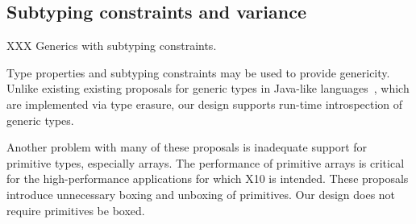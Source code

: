 \documentclass[preprint,nocopyrightspace,9pt]{sigplanconf}
\begin{document}
\subsection{Subtyping constraints and variance}
\label{sec:variance}

XXX Generics with subtyping constraints.

Type properties and subtyping constraints may be used to 
provide genericity.  Unlike existing 
existing proposals for generic types in
Java-like
languages~\cite{Java3,adding-wildcards,GJ,Pizza,polyj,thorup97,allen03,allen04,csharp,emir06,scala},
which 
are implemented via type erasure,
our design supports run-time introspection of generic types.

Another problem with many of these proposals is inadequate support
for primitive types, especially arrays. The performance of primitive arrays is
critical for the high-performance applications for which
X10 is intended. These proposals introduce unnecessary boxing
and unboxing of primitives.
Our design does not require primitives be boxed.
\end{document}
